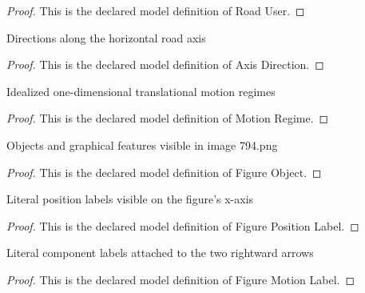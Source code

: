 \begin{proof}
  This is the declared model definition of Road User.
\end{proof}
\begin{definition}
  \label{def:physics:phyx-mini-0794:phyxminiproblems-problemphyxmini0794-axisdirection}
  Directions along the horizontal road axis
\end{definition}
\begin{proof}
  This is the declared model definition of Axis Direction.
\end{proof}
\begin{definition}
  \label{def:physics:phyx-mini-0794:phyxminiproblems-problemphyxmini0794-motionregime}
  Idealized one-dimensional translational motion regimes
\end{definition}
\begin{proof}
  This is the declared model definition of Motion Regime.
\end{proof}
\begin{definition}
  \label{def:physics:phyx-mini-0794:phyxminiproblems-problemphyxmini0794-figureobject}
  Objects and graphical features visible in image 794.png
\end{definition}
\begin{proof}
  This is the declared model definition of Figure Object.
\end{proof}
\begin{definition}
  \label{def:physics:phyx-mini-0794:phyxminiproblems-problemphyxmini0794-figurepositionlabel}
  Literal position labels visible on the figure's x-axis
\end{definition}
\begin{proof}
  This is the declared model definition of Figure Position Label.
\end{proof}
\begin{definition}
  \label{def:physics:phyx-mini-0794:phyxminiproblems-problemphyxmini0794-figuremotionlabel}
  Literal component labels attached to the two rightward arrows
\end{definition}
\begin{proof}
  This is the declared model definition of Figure Motion Label.
\end{proof}
